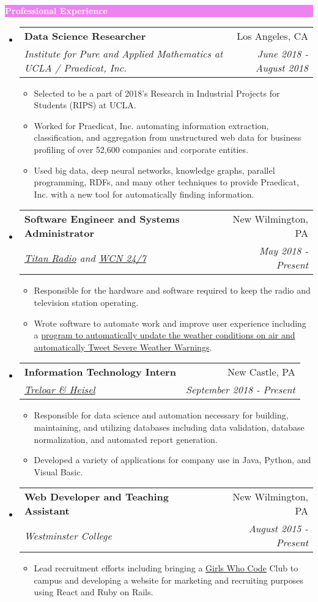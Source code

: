 \documentclass[letterpaper,11pt]{article}
\makeatletter
\newcommand{\resitem}[1]{\item #1 \vspace{-2pt}}
\newcommand{\resheading}[1]{{\large \colorbox{violet}{\begin{minipage}{\textwidth}{\textbf{#1 \vphantom{p\^{E}}}}\end{minipage}}}}
\newcommand{\ressubheading}[4]{
	\begin{tabular*}{7.0in}{l@{\extracolsep{\fill}}r}
		\textbf{#1} & #2 \\
		\textit{#3} & \textit{#4} \\
	\end{tabular*}\vspace{-6pt}}
\makeatother
\begin{document}
	\resheading{\textcolor{white}{Professional Experience}}
	\begin{itemize}
		\item
		\ressubheading{Data Science Researcher}{Los Angeles, CA}{Institute for Pure and Applied Mathematics at UCLA / Praedicat, Inc.}{June 2018 -August 2018}
		\begin{itemize}
			\resitem{Selected to be a part of 2018’s Research in Industrial Projects for Students (RIPS) at UCLA.}
			\resitem{Worked for Praedicat, Inc. automating information extraction, classification, and aggregation from unstructured web data for business profiling of over 52,600 companies and corporate entities.}
			\resitem{Used big data, deep neural networks, knowledge graphs, parallel programming, RDFs, and many other techniques to provide Praedicat, Inc. with a new tool for automatically finding information.}
		\end{itemize}
		\item
		\ressubheading{Software Engineer and Systems Administrator}{New Wilmington, PA}{\href{http://titanradio.net/}{Titan Radio} and \href{https://www.wcn247.com/}{WCN 24/7}}{May 2018 - Present}
		\begin{itemize}
			\resitem{Responsible for the hardware and software required to keep the radio and television station operating.}
			\resitem{Wrote software to automate work and improve user experience including a \href{https://github.com/alexandermichels/WeatherWaves}{program to automatically update the weather conditions on air and automatically Tweet Severe Weather Warnings}.}
		\end{itemize}
		\item
		\ressubheading{Information Technology Intern}{New Castle, PA}{\href{http://treloaronline.com/}{Treloar \& Heisel}}{September 2018 - Present}
		\begin{itemize}
			\resitem{Responsible for data science and automation necessary for building, maintaining, and utilizing databases including data validation, database normalization, and  automated report generation.}
			\resitem{Developed a variety of applications for company use in Java, Python, and Visual Basic.}
		\end{itemize}
		\item
		\ressubheading{Web Developer and Teaching Assistant}{New Wilmington, PA}{Westminster College}{August 2015 - Present}
		\begin{itemize}
			\resitem{Lead recruitment efforts including bringing a \href{https://girlswhocode.com}{Girls Who Code} Club to campus and  developing a website for marketing and recruiting purposes using React and Ruby on Rails.}

\end{itemize}
\end{itemize}
\end{document}
